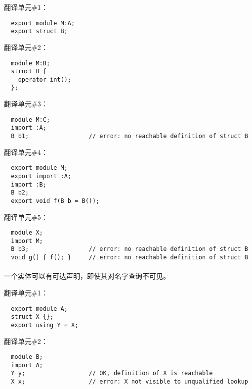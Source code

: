 \begin{example}

  翻译单元\#1：
  \begin{lstlisting}
  export module M:A;
  export struct B;
  \end{lstlisting}
  翻译单元\#2：
  \begin{lstlisting}
  module M:B;
  struct B {
    operator int();
  };
  \end{lstlisting}
  翻译单元\#3：
  \begin{lstlisting}
  module M:C;
  import :A;
  B b1;                 // error: no reachable definition of struct B
  \end{lstlisting}
  翻译单元\#4：
  \begin{lstlisting}
  export module M;
  export import :A;
  import :B;
  B b2;
  export void f(B b = B());
  \end{lstlisting}
  翻译单元\#5：
  \begin{lstlisting}
  module X;
  import M;
  B b3;                 // error: no reachable definition of struct B
  void g() { f(); }     // error: no reachable definition of struct B
  \end{lstlisting}
\end{example}

\paragraph{} %
\begin{note}
  一个实体可以有可达声明，即使其对名字查询不可见。
\end{note}

\begin{example}

  翻译单元\#1：
  \begin{lstlisting}
  export module A;
  struct X {};
  export using Y = X;
  \end{lstlisting}
  翻译单元\#2：
  \begin{lstlisting}
  module B;
  import A;
  Y y;                  // OK, definition of X is reachable
  X x;                  // error: X not visible to unqualified lookup
  \end{lstlisting}
\end{example}
